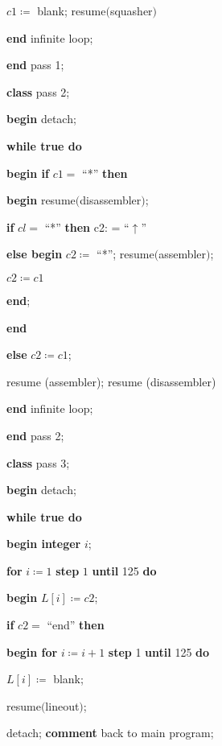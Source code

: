 \quad \quad \quad \quad $c1\coloneq$ blank; resume$($squasher$)$

\quad \quad \quad \textbf{end} infinite loop;

\quad \textbf{end} pass 1;

\quad \textbf{class} pass 2;

\quad \textbf{begin} detach;

\quad \quad \textbf{while true do}

\quad \quad \quad \textbf{begin if} $c1 =$ ``*'' \textbf{then}

\quad \quad \quad \quad \textbf{begin} resume$($disassembler$)$;

\quad \quad \quad \quad \quad \textbf{if} $cl =$ ``*'' \textbf{then} c2: = ``$\uparrow$''

\quad \quad \quad \quad \quad \textbf{else begin} $c2 \coloneq$ ``*''; resume$($assembler$)$;

\quad \quad \quad \quad \quad \quad $c2\coloneq c1$

\quad \quad \quad \quad \quad \textbf{end};

\quad \quad \quad \quad \textbf{end}

\quad \quad \quad \textbf{else} $c2\coloneq c1$;

\quad \quad \quad resume (assembler); resume (disassembler)

\quad \textbf{end} infinite loop;

\quad \textbf{end} pass 2;

\quad \textbf{class} pass 3;

\quad \textbf{begin} detach;

\quad \quad \textbf{while true do}

\quad \quad \quad \textbf{begin integer} $i$;

\quad \quad \quad \quad \textbf{for} $i\coloneq 1$ \textbf{step} $1$ \textbf{until} 125 \textbf{do}

\quad \quad \quad \quad \quad \textbf{begin} $L[i] \coloneq c2$;

\quad \quad \quad \quad \quad \quad \textbf{if} $c2 =$ ``end'' \textbf{then}

\quad \quad \quad \quad \quad \quad \textbf{begin for} $i\coloneq i + 1$ \textbf{step} 1 \textbf{until} 125 \textbf{do}

\quad \quad \quad \quad \quad \quad \quad $L[i] \coloneq$ blank;

\quad \quad \quad \quad \quad \quad \quad resume$($lineout$)$;

\quad \quad \quad \quad \quad \quad \quad detach; \textbf{comment} back to main program;

